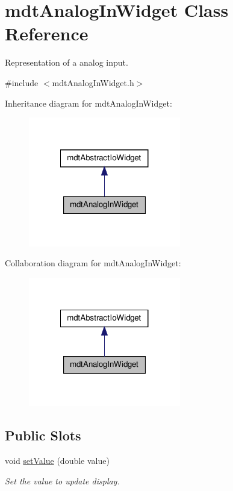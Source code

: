\hypertarget{classmdt_analog_in_widget}{
\section{mdtAnalogInWidget Class Reference}
\label{classmdt_analog_in_widget}
}


Representation of a analog input.  




{\ttfamily \#include $<$mdtAnalogInWidget.h$>$}



Inheritance diagram for mdtAnalogInWidget:
\nopagebreak
\begin{figure}[H]
\begin{center}
\leavevmode
\includegraphics[width=188pt]{classmdt_analog_in_widget__inherit__graph}
\end{center}
\end{figure}


Collaboration diagram for mdtAnalogInWidget:
\nopagebreak
\begin{figure}[H]
\begin{center}
\leavevmode
\includegraphics[width=188pt]{classmdt_analog_in_widget__coll__graph}
\end{center}
\end{figure}
\subsection*{Public Slots}
\begin{DoxyCompactItemize}
\item 
\hypertarget{classmdt_analog_in_widget_ab59995a9cc04fe152224b299c5b4cb55}{
void \hyperlink{classmdt_analog_in_widget_ab59995a9cc04fe152224b299c5b4cb55}{setValue} (double value)}
\label{classmdt_analog_in_widget_ab59995a9cc04fe152224b299c5b4cb55}

\begin{DoxyCompactList}\small\item\em Set the value to update display. \end{DoxyCompactList}\end{DoxyCompactItemize}
